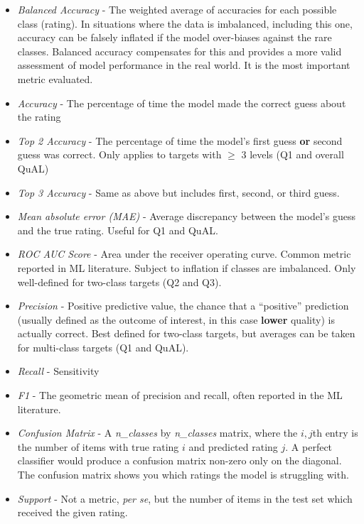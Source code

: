 \documentclass[
  letterpaper,
  DIV=11,
  numbers=noendperiod]{scrartcl}
\providecommand{\tightlist}{%
  \setlength{\itemsep}{0pt}\setlength{\parskip}{0pt}}\usepackage{longtable,booktabs,array}
\begin{document}
\begin{itemize}
\tightlist
\item
  \emph{Balanced Accuracy} - The weighted average of accuracies for each
  possible class (rating). In situations where the data is imbalanced,
  including this one, accuracy can be falsely inflated if the model
  over-biases against the rare classes. Balanced accuracy compensates
  for this and provides a more valid assessment of model performance in
  the real world. It is the most important metric evaluated.
\item
  \emph{Accuracy} - The percentage of time the model made the correct
  guess about the rating
\item
  \emph{Top 2 Accuracy} - The percentage of time the model's first guess
  \textbf{or} second guess was correct. Only applies to targets with
  \(\geq\) 3 levels (Q1 and overall QuAL)
\item
  \emph{Top 3 Accuracy} - Same as above but includes first, second, or
  third guess.
\item
  \emph{Mean absolute error (MAE)} - Average discrepancy between the
  model's guess and the true rating. Useful for Q1 and QuAL.
\item
  \emph{ROC AUC Score} - Area under the receiver operating curve. Common
  metric reported in ML literature. Subject to inflation if classes are
  imbalanced. Only well-defined for two-class targets (Q2 and Q3).
\item
  \emph{Precision} - Positive predictive value, the chance that a
  ``positive'' prediction (usually defined as the outcome of interest,
  in this case \textbf{lower} quality) is actually correct. Best defined
  for two-class targets, but averages can be taken for multi-class
  targets (Q1 and QuAL).
\item
  \emph{Recall} - Sensitivity
\item
  \emph{F1} - The geometric mean of precision and recall, often reported
  in the ML literature.
\item
  \emph{Confusion Matrix} - A \emph{n\_classes} by \emph{n\_classes}
  matrix, where the \(i,j\)th entry is the number of items with true
  rating \(i\) and predicted rating \(j\). A perfect classifier would
  produce a confusion matrix non-zero only on the diagonal. The
  confusion matrix shows you which ratings the model is struggling with.
\item
  \emph{Support} - Not a metric, \emph{per se}, but the number of items
  in the test set which received the given rating.
\end{itemize}
\end{document}
